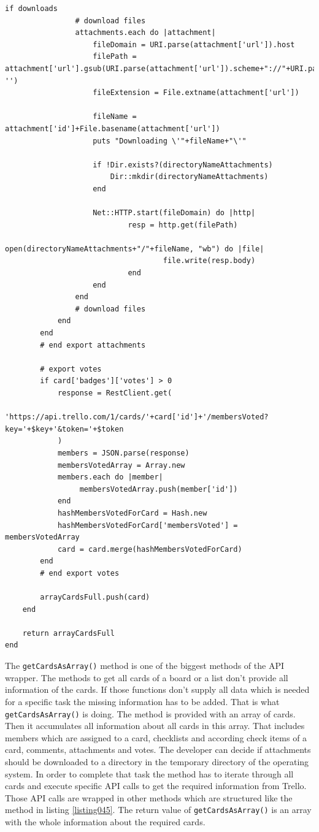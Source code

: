 \begin{lstlisting}[aboveskip=1\baselineskip, caption= getCardsAsArray(), label=listing063]
			if downloads
				# download files
				attachments.each do |attachment|
					fileDomain = URI.parse(attachment['url']).host
					filePath = attachment['url'].gsub(URI.parse(attachment['url']).scheme+"://"+URI.parse(attachment['url']).host, '')
					fileExtension = File.extname(attachment['url'])
					
					fileName = attachment['id']+File.basename(attachment['url'])
					puts "Downloading \'"+fileName+"\'"
								
					if !Dir.exists?(directoryNameAttachments)
						Dir::mkdir(directoryNameAttachments)
					end
					
					Net::HTTP.start(fileDomain) do |http|
							resp = http.get(filePath)
							open(directoryNameAttachments+"/"+fileName, "wb") do |file|
									file.write(resp.body)
							end
					end      
				end
				# download files
			end       
		end	
		# end export attachments
		
		# export votes
		if card['badges']['votes'] > 0
			response = RestClient.get(
					'https://api.trello.com/1/cards/'+card['id']+'/membersVoted?key='+$key+'&token='+$token
			)
			members = JSON.parse(response)
			membersVotedArray = Array.new
			members.each do |member|
				 membersVotedArray.push(member['id'])
			end
			hashMembersVotedForCard = Hash.new			
			hashMembersVotedForCard['membersVoted'] = membersVotedArray
			card = card.merge(hashMembersVotedForCard)	
		end
		# end export votes
		
		arrayCardsFull.push(card)
	end
	
	return arrayCardsFull
end
\end{lstlisting}

The \lstinline{getCardsAsArray()} method is one of the biggest methods of the API wrapper. The methods to get all cards of a board or a list don't provide all information of the cards. If those functions don't supply all data which is needed for a specific task the missing information has to be added. That is what \lstinline{getCardsAsArray()} is doing. The method is provided with an array of cards. Then it accumulates all information about all cards in this array. That includes members which are assigned to a card, checklists and according check items of a card, comments, attachments and votes. The developer can decide if attachments should be downloaded to a directory in the temporary directory of the operating system. In order to complete that task the method has to iterate through all cards and execute specific API calls to get the required information from Trello. Those API calls are wrapped in other methods which are structured like the method in listing \ref{listing045}. The return value of \lstinline{getCardsAsArray()} is an array with the whole information about the required cards.


